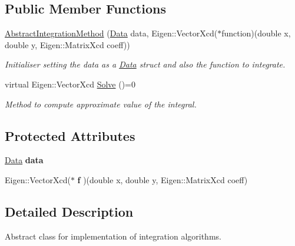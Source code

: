 \subsection*{Public Member Functions}
\begin{DoxyCompactItemize}
\item 
\mbox{\label{class_abstract_integration_method_a2b3a0208c99564d496e27b383fc4d96f}} 
\hyperlink{class_abstract_integration_method_a2b3a0208c99564d496e27b383fc4d96f}{Abstract\+Integration\+Method} (\hyperlink{struct_data}{Data} data, Eigen\+::\+Vector\+Xcd($\ast$function)(double x, double y, Eigen\+::\+Matrix\+Xcd coeff))
\begin{DoxyCompactList}\small\item\em Initialiser setting the data as a \hyperlink{struct_data}{Data} struct and also the function to integrate. \end{DoxyCompactList}\item 
virtual Eigen\+::\+Vector\+Xcd \hyperlink{class_abstract_integration_method_af76e5bdce7d0b139d07e920fa29c1c34}{Solve} ()=0
\begin{DoxyCompactList}\small\item\em Method to compute approximate value of the integral. \end{DoxyCompactList}\end{DoxyCompactItemize}
\subsection*{Protected Attributes}
\begin{DoxyCompactItemize}
\item 
\mbox{\label{class_abstract_integration_method_a534b5ff7dfbccc1332cfbe66e817b389}} 
\hyperlink{struct_data}{Data} {\bfseries data}
\item 
\mbox{\label{class_abstract_integration_method_a4de4f7ee55737b4f05f2b02649bf5ea0}} 
Eigen\+::\+Vector\+Xcd($\ast$ {\bfseries f} )(double x, double y, Eigen\+::\+Matrix\+Xcd coeff)
\end{DoxyCompactItemize}


\subsection{Detailed Description}
Abstract class for implementation of integration algorithms. 

